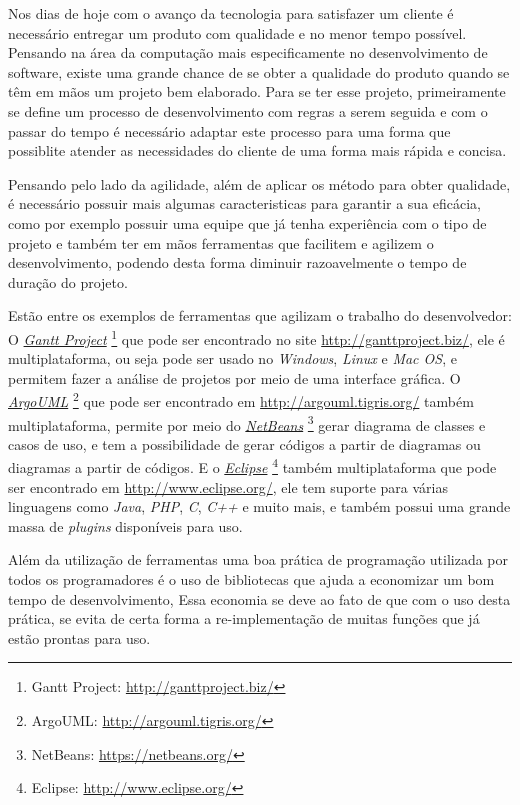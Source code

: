 Nos dias de hoje com o avanço da tecnologia para satisfazer um cliente é necessário entregar um 
produto com qualidade e no menor tempo possível. Pensando na área da computação mais 
especificamente no desenvolvimento de software, existe uma grande chance de se obter a qualidade 
do produto quando se têm em mãos um projeto bem elaborado. Para se ter esse projeto, primeiramente  
se define um processo de desenvolvimento com regras a serem seguida e com o passar do tempo é 
necessário adaptar este processo para uma forma que possiblite atender as necessidades do cliente 
de uma forma mais rápida e concisa.

Pensando pelo lado da agilidade, além de aplicar os método para obter qualidade, é necessário 
possuir mais algumas caracteristicas para garantir a sua eficácia, como por exemplo possuir uma 
equipe que já tenha experiência com o tipo de projeto e também ter em mãos ferramentas que facilitem e 
agilizem o desenvolvimento, podendo desta forma diminuir razoavelmente o tempo de duração do projeto. 

Estão entre os exemplos de ferramentas que agilizam o trabalho do desenvolvedor: O 
\emph{\href{http://ganttproject.biz/}{Gantt Project}} \footnote{Gantt Project: 
\url{http://ganttproject.biz/}} que pode ser encontrado no site \url{http://ganttproject.biz/}, ele 
é multiplataforma, ou seja pode ser usado no \emph{Windows}, \emph{Linux} e \emph{Mac OS}, e permitem 
fazer a análise de projetos por meio de uma interface gráfica. O 
\emph{\href{http://argouml.tigris.org/}{ArgoUML}} \footnote{ArgoUML: \url{http://argouml.tigris.org/}} 
que pode ser encontrado em  \url{http://argouml.tigris.org/} também multiplataforma, permite 
por meio do \emph{\href{https://netbeans.org/}{NetBeans}} \footnote{NetBeans: 
\url{https://netbeans.org/}} gerar diagrama de classes e casos de uso, e tem a possibilidade de gerar 
códigos a partir de diagramas ou diagramas a partir de códigos. E o 
\emph{\href{http://www.eclipse.org/}{Eclipse}} \footnote{Eclipse: \url{http://www.eclipse.org/}} 
também multiplataforma que pode ser encontrado em \url{http://www.eclipse.org/}, ele tem suporte 
para várias linguagens como \emph{Java}, \emph{PHP}, \emph{C}, \emph{C++} e muito mais, e também 
possui uma grande massa de \emph{plugins} disponíveis para uso.

Além da utilização de ferramentas uma boa prática de programação utilizada por todos os 
programadores é o uso de bibliotecas que ajuda a economizar um bom tempo de desenvolvimento, 
Essa economia se deve ao fato de que com o uso desta prática, se evita de certa 
forma a re-implementação de muitas funções que já estão prontas para uso. 

